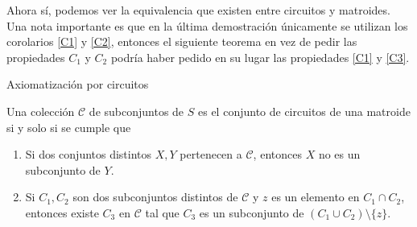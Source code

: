 Ahora sí, podemos ver la equivalencia que existen entre circuitos y matroides. Una nota importante es que en la última demostración únicamente se utilizan los corolarios \ref{C1} y \ref{C2}, entonces el siguiente teorema en vez de pedir las propiedades $C_1$ y $C_2$ podría haber pedido en su lugar las propiedades \ref{C1} y \ref{C3}.

\begin{teo} {Axiomatización por circuitos}\label{circuitos}

Una colección $\mathcal{C}$ de subconjuntos de $S$ es el conjunto de circuitos de una matroide si y solo si se cumple que 
\begin{enumerate}
\item Si dos conjuntos distintos $X,Y$ pertenecen a $\mathcal{C}$, entonces $X$ no es un subconjunto de $Y$.
\item Si $C_1,C_2$ son dos subconjuntos distintos de $\mathcal{C}$ y $z$ es un elemento en $C_1 \cap C_2$, entonces existe $C_3$ en $\mathcal{C}$ tal que $C_3$ es un subconjunto de $(C_1 \cup C_2)\setminus \{z\}$.
\end{enumerate}
\end{teo}

